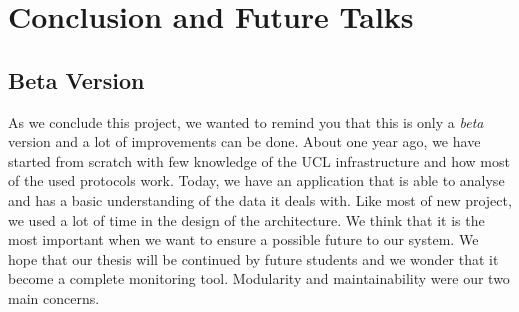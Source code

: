 
\chapter{Conclusion and Future Talks} %

\label{Chapter7} %


\section{Beta Version}
As we conclude this project, we wanted to remind you that this is only a \emph{beta} version and a lot of improvements can be done. About one year ago, we have started from scratch with few knowledge of the UCL infrastructure and how most of the used protocols work. Today, we have an application that is able to analyse and has a basic understanding of the data it deals with. Like most of new project, we used a lot of time in the design of the architecture. We think that it is the most important when we want to ensure a possible future to our system. We hope that our thesis will be continued by future students and we wonder that it become a complete monitoring tool. Modularity and maintainability were our two main concerns.

